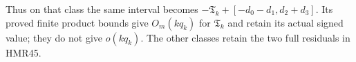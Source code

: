 Thus on that class the same interval becomes
$-\mathfrak T_k+[-d_0-d_1,d_2+d_3]$.
Its proved finite product bounds give $O_m(kq_k)$
for $\mathfrak T_k$ and retain its actual signed value;
they do not give $o(kq_k)$. The other classes retain
the two full residuals in HMR45.